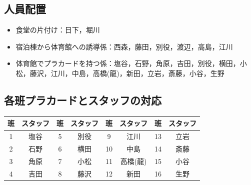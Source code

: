 \vspace{-3mm}
\subsection{人員配置}
\begin{itemize}
\item 食堂の片付け：日下，堀川
\item 宿泊棟から体育館への誘導係：西森，藤田，別役，渡辺，高島，江川
\item 体育館でプラカードを持つ係：塩谷，石野，角原，吉田，別役，横田，小松，藤沢，江川，中島，高橋(龍)，新田，立岩，斎藤，小谷，生野
\end{itemize}

\subsection{各班プラカードとスタッフの対応}
\begin{table}[h]
\begin{center}
\label{sec:card}
\begin{tabular}{|c|c||c|c||c|c||c|c|}
\hline
{班}&{スタッフ}&{班}&{スタッフ}&{班}&{スタッフ}&{班}&{スタッフ} \\ \hline\hline
1 & 塩谷 & 5 & 別役 &  9 & 江川 & 13 & 立岩 \\ \hline
2 & 石野 & 6 & 横田 & 10 & 中島 & 14 & 斎藤 \\ \hline
3 & 角原 & 7 & 小松 & 11 & 高橋(龍) & 15 & 小谷 \\ \hline
4 & 吉田 & 8 & 藤沢 & 12 & 新田 &16 & 生野 \\ \hline
\end{tabular}
\end{center}
\end{table}

\vspace{-3mm}
